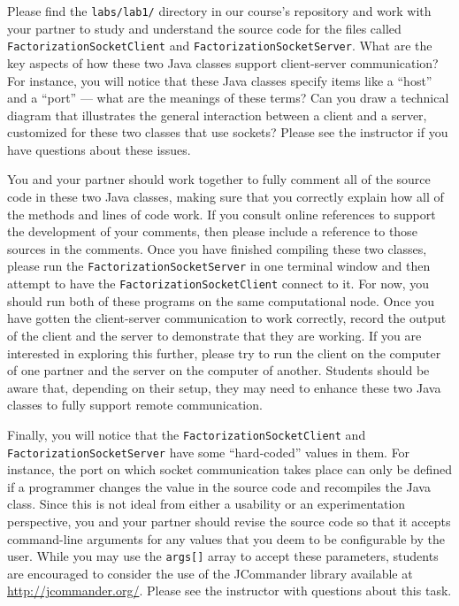 Please find the {\tt labs/lab1/} directory in our course's repository and work with your partner to study and understand
the source code for the files called {\tt FactorizationSocketClient} and {\tt FactorizationSocketServer}. What are the
key aspects of how these two Java classes support client-server communication? For instance, you will notice that these
Java classes specify items like a ``host'' and a ``port'' --- what are the meanings of these terms? Can you draw a
technical diagram that illustrates the general interaction between a client and a server, customized for these two
classes that use sockets? Please see the instructor if you have questions about these issues.

You and your partner should work together to fully comment all of the source code in these two Java classes, making sure
that you correctly explain how all of the methods and lines of code work. If you consult online references to support
the development of your comments, then please include a reference to those sources in the comments. Once you have
finished compiling these two classes, please run the {\tt FactorizationSocketServer} in one terminal window and then
attempt to have the {\tt FactorizationSocketClient} connect to it. For now, you should run both of these programs on the
same computational node. Once you have gotten the client-server communication to work correctly, record the output of
the client and the server to demonstrate that they are working. If you are interested in exploring this further, please
try to run the client on the computer of one partner and the server on the computer of another. Students should be aware
that, depending on their setup, they may need to enhance these two Java classes to fully support remote communication.

Finally, you will notice that the {\tt FactorizationSocketClient} and {\tt FactorizationSocketServer} have some
``hard-coded'' values in them. For instance, the port on which socket communication takes place can only be defined if a
programmer changes the value in the source code and recompiles the Java class. Since this is not ideal from either a
usability or an experimentation perspective, you and your partner should revise the source code so that it accepts
command-line arguments for any values that you deem to be configurable by the user. While you may use the {\tt args[]}
array to accept these parameters, students are encouraged to consider the use of the JCommander library available at
\url{http://jcommander.org/}. Please see the instructor with questions about this task.

